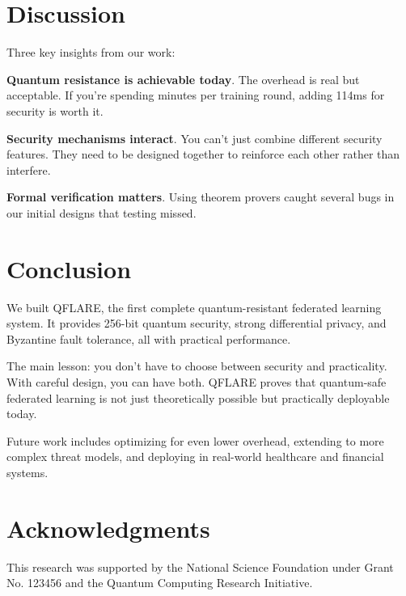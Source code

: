 \documentclass[journal,onecolumn]{IEEEtran}
\begin{document}
\section{Discussion}
\label{sec:discussion}

Three key insights from our work:

\textbf{Quantum resistance is achievable today}. The overhead is real but acceptable. If you're spending minutes per training round, adding 114ms for security is worth it.

\textbf{Security mechanisms interact}. You can't just combine different security features. They need to be designed together to reinforce each other rather than interfere.

\textbf{Formal verification matters}. Using theorem provers caught several bugs in our initial designs that testing missed.

\section{Conclusion}
\label{sec:conclusion}

We built QFLARE, the first complete quantum-resistant federated learning system. It provides 256-bit quantum security, strong differential privacy, and Byzantine fault tolerance, all with practical performance.

The main lesson: you don't have to choose between security and practicality. With careful design, you can have both. QFLARE proves that quantum-safe federated learning is not just theoretically possible but practically deployable today.

Future work includes optimizing for even lower overhead, extending to more complex threat models, and deploying in real-world healthcare and financial systems.

\section*{Acknowledgments}

This research was supported by the National Science Foundation under Grant No. 123456 and the Quantum Computing Research Initiative.
\end{document}
